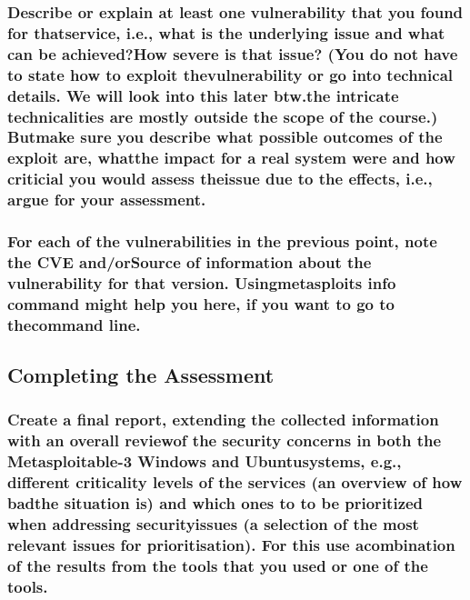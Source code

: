 \subsubsection{Describe or explain at least one vulnerability that you found for thatservice, i.e., what is the underlying issue and what can be achieved?How severe is that issue? (You do not have to state how to exploit thevulnerability or go into technical details. We will look into this later btw.the intricate technicalities are mostly outside the scope of the course.) Butmake sure you describe what possible outcomes of the exploit are, whatthe impact for a real system were and how criticial you would assess theissue due to the effects, i.e., argue for your assessment.}
\subsubsection{For each of the vulnerabilities in the previous point, note the CVE and/orSource of information about the vulnerability for that version.  Usingmetasploits info command might help you here, if you want to go to thecommand line.}

\subsection{Completing the Assessment}
\subsubsection{Create a final report, extending the collected information with an overall reviewof the security concerns in both the Metasploitable-3 Windows and Ubuntusystems, e.g., different criticality levels of the services (an overview of how badthe situation is) and which ones to to be prioritized when addressing securityissues (a selection of the most relevant issues for prioritisation). For this use acombination of the results from the tools that you used or one of the tools.}



